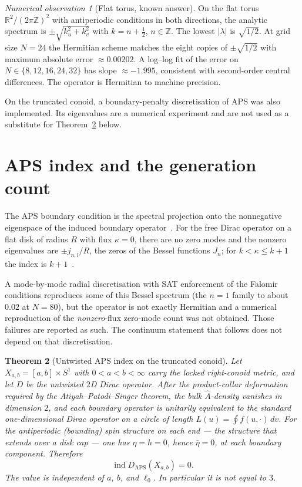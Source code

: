 \documentclass[11pt,a4paper]{article}
\newtheorem{theorem}{Theorem}
\theoremstyle{definition}
\theoremstyle{remark}
\newtheorem{numobs}[theorem]{Numerical observation}
\begin{document}
\begin{numobs}[Flat torus, known answer]
On the flat torus $\mathbb{R}^2/(2\pi\mathbb{Z})^2$ with antiperiodic
conditions in both directions, the analytic spectrum is
$\pm\sqrt{k_u^2+k_v^2}$ with $k=n+\tfrac12$, $n\in\mathbb{Z}$. The
lowest $\lvert\lambda\rvert$ is $\sqrt{1/2}$. At grid size $N=24$ the
Hermitian scheme matches the eight copies of $\pm\sqrt{1/2}$ with
maximum absolute error $\approx 0.00202$. A log--log fit of the error
on $N\in\{8,12,16,24,32\}$ has slope $\approx-1.995$, consistent with
second-order central differences. The operator is Hermitian to machine
precision.
\end{numobs}

On the truncated conoid, a boundary-penalty discretisation of APS was
also implemented. Its eigenvalues are a numerical experiment and are
not used as a substitute for Theorem~\ref{thm:aps0} below.

\section{APS index and the generation count}
\label{sec:aps}

The APS boundary condition is the spectral projection onto the nonnegative
eigenspace of the induced boundary operator~\cite{APS1975,FalomirDisk}.
For the free Dirac operator on a flat disk of radius $R$ with flux
$\kappa=0$, there are no zero modes and the nonzero eigenvalues are
$\pm j_{n,l}/R$, the zeros of the Bessel functions $J_n$; for
$k<\kappa\le k+1$ the index is $k+1$~\cite{FalomirDisk}.

A mode-by-mode radial discretisation with SAT enforcement of the Falomir
conditions reproduces some of this Bessel spectrum (the $n=1$ family to
about $0.02$ at $N=80$), but the operator is not exactly Hermitian and a
numerical reproduction of the \emph{nonzero}-flux zero-mode count was not
obtained. Those failures are reported as such. The continuum statement
that follows does not depend on that discretisation.

\begin{theorem}[Untwisted APS index on the truncated conoid]
\label{thm:aps0}
Let $X_{a,b}=[a,b]\times S^1$ with $0<a<b<\infty$ carry the locked
right-conoid metric, and let $D$ be the untwisted $2$D Dirac operator.
After the product-collar deformation required by the Atiyah--Patodi--Singer
theorem, the bulk $\hat A$-density vanishes in dimension $2$, and each
boundary operator is unitarily equivalent to the standard one-dimensional
Dirac operator on a circle of length $L(u)=\oint f(u,\cdot)\,dv$. For the
antiperiodic (bounding) spin structure on each end --- the structure that
extends over a disk cap --- one has $\eta=h=0$, hence $\bar\eta=0$, at
each boundary component. Therefore
\[
  \operatorname{ind} D_{\mathrm{APS}}(X_{a,b})=0.
\]
The value is independent of $a$, $b$, and $\ell_0$. In particular it is
not equal to $3$.
\end{theorem}
\end{document}
